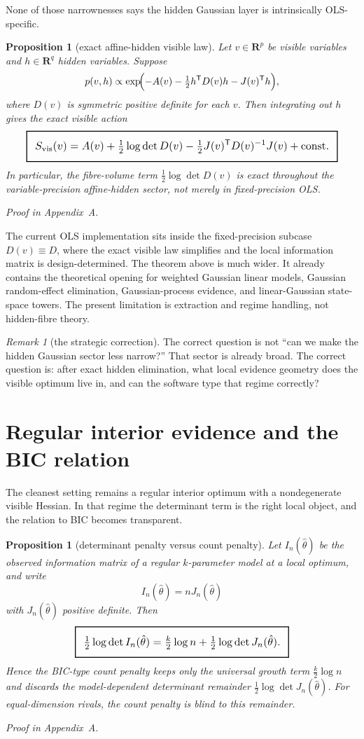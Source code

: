 \documentclass[11pt,a4paper]{article}
\numberwithin{equation}{section}
\newcommand{\R}{\mathbf R}
\newcommand{\geomboxed}[1]{%
  \setlength{\fboxsep}{8pt}%
  \setlength{\fboxrule}{0.9pt}%
  \fbox{\scalebox{1.12}{$\displaystyle #1$}}%
}
\theoremstyle{thmcompact}
\newtheorem{proposition}[theorem]{Proposition}
\theoremstyle{remark}
\newtheorem*{remarkplain}{Remark}
\newenvironment{remark}[1][]%
{\begin{remarkbox}\begin{remarkplain}[#1]\normalfont}
{\end{remarkplain}\end{remarkbox}}
\newcommand{\proofappendix}{\par{\hfill\scriptsize\emph{Proof in Appendix~A.}}\par}
\begin{document}
None of those narrownesses says the hidden Gaussian layer is intrinsically OLS-specific.

\begin{proposition}[exact affine-hidden visible law]\label{prop:affine-hidden-visible-law}
Let $v\in\R^p$ be visible variables and $h\in\R^q$ hidden variables. Suppose
\[
p(v,h) \propto \exp\!\Bigl(-A(v)-\tfrac12 h^{\mathsf T}D(v)h-J(v)^{\mathsf T}h\Bigr),
\]
where $D(v)$ is symmetric positive definite for each $v$. Then integrating out $h$ gives the exact visible action
\[
\geomboxed{
S_{\mathrm{vis}}(v)
=
A(v)
+
\tfrac12 \log\det D(v)
-
\tfrac12 J(v)^{\mathsf T}D(v)^{-1}J(v)
+
\mathrm{const}.}
\]
In particular, the fibre-volume term $\tfrac12\log\det D(v)$ is exact throughout the variable-precision affine-hidden sector, not merely in fixed-precision OLS.\proofappendix
\end{proposition}

The current OLS implementation sits inside the fixed-precision subcase $D(v)\equiv D$, where the exact visible law simplifies and the local information matrix is design-determined. The theorem above is much wider. It already contains the theoretical opening for weighted Gaussian linear models, Gaussian random-effect elimination, Gaussian-process evidence, and linear-Gaussian state-space towers. The present limitation is extraction and regime handling, not hidden-fibre theory.

\begin{remark}[the strategic correction]
The correct question is not ``can we make the hidden Gaussian sector less narrow?'' That sector is already broad. The correct question is: after exact hidden elimination, what local evidence geometry does the visible optimum live in, and can the software type that regime correctly?
\end{remark}

\section{Regular interior evidence and the BIC relation}

The cleanest setting remains a regular interior optimum with a nondegenerate visible Hessian. In that regime the determinant term is the right local object, and the relation to BIC becomes transparent.

\begin{proposition}[determinant penalty versus count penalty]\label{prop:det-vs-count}
Let $I_n(\hat\theta)$ be the observed information matrix of a regular $k$-parameter model at a local optimum, and write
\[
I_n(\hat\theta)=nJ_n(\hat\theta)
\]
with $J_n(\hat\theta)$ positive definite. Then
\[
\geomboxed{
\tfrac12\log\det I_n(\hat\theta)
=
\tfrac{k}{2}\log n
+
\tfrac12\log\det J_n(\hat\theta).}
\]
Hence the BIC-type count penalty keeps only the universal growth term $\tfrac{k}{2}\log n$ and discards the model-dependent determinant remainder $\tfrac12\log\det J_n(\hat\theta)$. For equal-dimension rivals, the count penalty is blind to this remainder.\proofappendix
\end{proposition}
\end{document}
